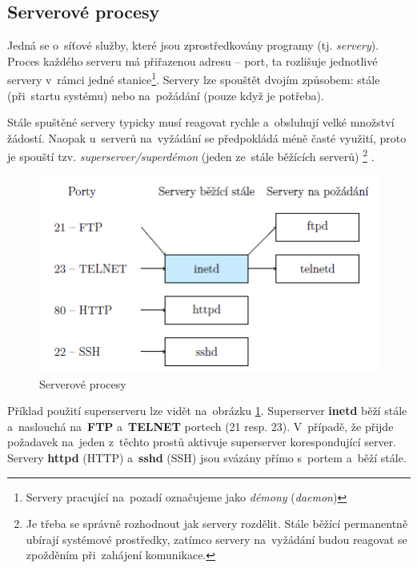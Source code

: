\subsection{Serverové procesy}

Jedná se o~síťové služby, které jsou zprostředkovány programy (tj. \emph{servery}). Proces každého serveru má přiřazenou adresu -- port, ta rozlišuje jednotlivé servery v~rámci jedné stanice\footnote{Servery pracující na~pozadí označujeme jako \emph{démony} (\emph{daemon})}. Servery lze spouštět dvojím způsobem: stále (při~startu systému) nebo na~požádání (pouze když je potřeba).

Stále spuštěné servery typicky musí reagovat rychle a~obsluhují velké množství žádostí. Naopak u~serverů na~vyžádání se předpokládá méně časté využití, proto je spouští tzv. \emph{superserver/superdémon} (jeden ze~stále běžících serverů)%
\footnote{Je třeba se správně rozhodnout jak servery rozdělit. Stále běžící permanentně ubírají systémové prostředky, zatímco servery na~vyžádání budou reagovat se zpožděním při~zahájení komunikace.}%
.

\begin{figure}[ht]
	\centering
	\includegraphics[scale=1]{images/network_server_proc.png}
	\caption{Serverové procesy}
	\label{network_server_proc}
\end{figure}

Příklad použití superserveru lze vidět na~obrázku \ref{network_server_proc}. Superserver \textbf{inetd} běží stále a~naslouchá na~\textbf{FTP} a~\textbf{TELNET} portech (21 resp. 23). V~případě, že přijde požadavek na~jeden z~těchto prostů aktivuje superserver korespondující server. Servery \textbf{httpd} (HTTP) a~\textbf{sshd} (SSH) jsou svázány přímo s~portem a~běží stále.
